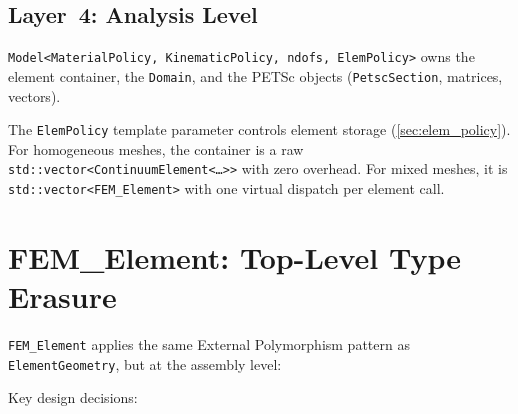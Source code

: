 \subsection{Layer~4: Analysis Level}
\label{sec:analysis_layer}

\texttt{Model<MaterialPolicy, KinematicPolicy, ndofs, ElemPolicy>} owns the
element container, the \texttt{Domain}, and the PETSc objects
(\texttt{PetscSection}, matrices, vectors).

The \texttt{ElemPolicy} template parameter controls element storage
(\cref{sec:elem_policy}).  For homogeneous meshes, the container is a raw
\texttt{std::vector<ContinuumElement<\ldots>>} with zero overhead.  For
mixed meshes, it is \texttt{std::vector<FEM\_Element>} with one virtual
dispatch per element call.


\section{FEM\_Element: Top-Level Type Erasure}
\label{sec:fem_element}

\texttt{FEM\_Element} applies the same External Polymorphism pattern as
\texttt{ElementGeometry}, but at the assembly level:

\begin{center}
\end{center}

Key design decisions:

